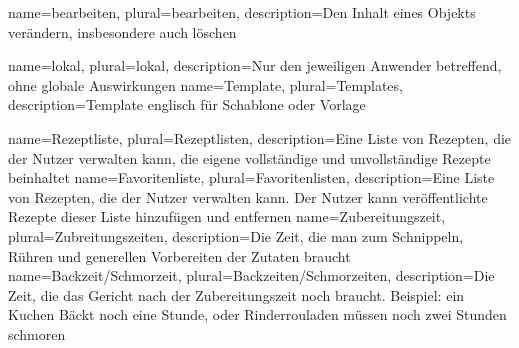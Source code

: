 {
	name=bearbeiten,
	plural=bearbeiten,
	description={Den Inhalt eines Objekts verändern, insbesondere auch löschen}
}

{
	name=lokal,
	plural=lokal,
	description={Nur den jeweiligen Anwender betreffend, ohne globale Auswirkungen}
}
{
	name=Template,
	plural=Templates,
	description={Template englisch für Schablone oder Vorlage}
}

{
	name=Rezeptliste,
	plural=Rezeptlisten,
	description={Eine Liste von Rezepten, die der Nutzer verwalten kann, die eigene vollständige und unvollständige Rezepte beinhaltet}
}
{
	name=Favoritenliste,
	plural=Favoritenlisten,
	description={Eine Liste von Rezepten, die der Nutzer verwalten kann. Der Nutzer kann veröffentlichte Rezepte dieser Liste hinzufügen und entfernen}
}
{
	name=Zubereitungszeit,
	plural=Zubreitungszeiten,
	description={Die Zeit, die man zum Schnippeln, Rühren und generellen Vorbereiten der Zutaten braucht}
}
{
	name=Backzeit/Schmorzeit,
	plural=Backzeiten/Schmorzeiten,
	description={Die Zeit, die das Gericht nach der Zubereitungszeit noch braucht. Beispiel: ein Kuchen Bäckt noch eine Stunde, oder Rinderrouladen müssen noch zwei Stunden schmoren}
}
